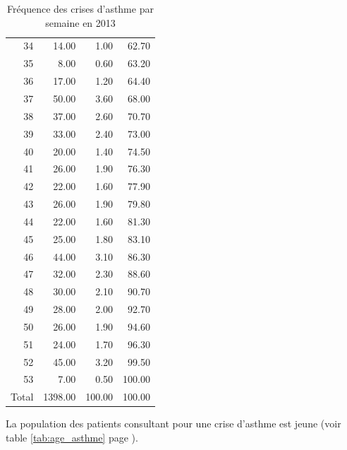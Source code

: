 \documentclass[12pt,english,french,twoside]{book}\usepackage[]{graphicx}\usepackage[]{color}
\begin{document}
\begin{table}[ht]
\begin{tabular}{rrrr}
  34 & 14.00 & 1.00 & 62.70 \\ 
  35 & 8.00 & 0.60 & 63.20 \\ 
  36 & 17.00 & 1.20 & 64.40 \\ 
  37 & 50.00 & 3.60 & 68.00 \\ 
  38 & 37.00 & 2.60 & 70.70 \\ 
  39 & 33.00 & 2.40 & 73.00 \\ 
  40 & 20.00 & 1.40 & 74.50 \\ 
  41 & 26.00 & 1.90 & 76.30 \\ 
  42 & 22.00 & 1.60 & 77.90 \\ 
  43 & 26.00 & 1.90 & 79.80 \\ 
  44 & 22.00 & 1.60 & 81.30 \\ 
  45 & 25.00 & 1.80 & 83.10 \\ 
  46 & 44.00 & 3.10 & 86.30 \\ 
  47 & 32.00 & 2.30 & 88.60 \\ 
  48 & 30.00 & 2.10 & 90.70 \\ 
  49 & 28.00 & 2.00 & 92.70 \\ 
  50 & 26.00 & 1.90 & 94.60 \\ 
  51 & 24.00 & 1.70 & 96.30 \\ 
  52 & 45.00 & 3.20 & 99.50 \\ 
  53 & 7.00 & 0.50 & 100.00 \\ 
    Total & 1398.00 & 100.00 & 100.00 \\ 
   \hline
\end{tabular}
\caption[Fréquence des crises d'asthme]{Fréquence des crises d'asthme par semaine en 2013} 
\label{tab:freq_asthme}
\end{table}



La population des patients consultant pour une crise d’asthme est jeune (voir table \ref{tab:age_asthme} page \pageref{tab:age_asthme}).
\end{document}
